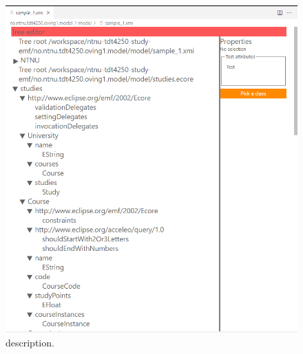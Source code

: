 \begin{figure}[htbp]  %
  \centering
  \includegraphics[width=\textwidth]{figures/gitpod-vscode-xmi-study-instance.png}
  \caption[title]{description.}\label{fig:label4}
\end{figure}

